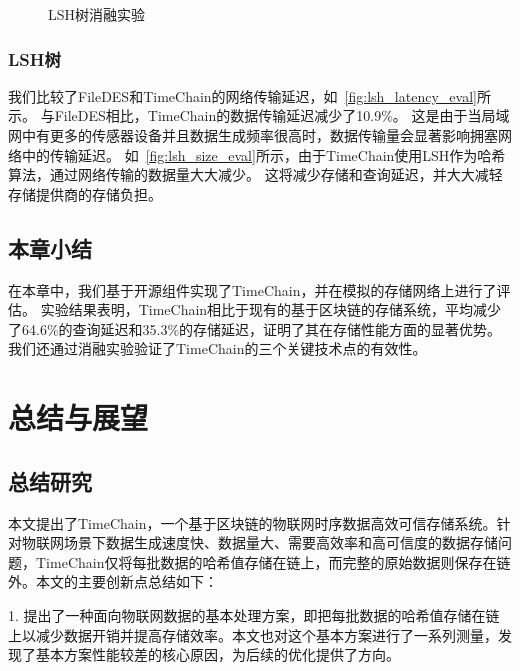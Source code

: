 \begin{figure*}[t]
    \centering
    \begin{minipage}{0.96\linewidth}
        \vspace{-0.5ex}
        \caption{LSH树消融实验} 
    \end{minipage}
\end{figure*}

\subsection{LSH树}
我们比较了FileDES和TimeChain的网络传输延迟，如~\autoref{fig:lsh_latency_eval}所示。
与FileDES相比，TimeChain的数据传输延迟减少了10.9\%。
这是由于当局域网中有更多的传感器设备并且数据生成频率很高时，数据传输量会显著影响拥塞网络中的传输延迟。
如~\autoref{fig:lsh_size_eval}所示，由于TimeChain使用LSH作为哈希算法，通过网络传输的数据量大大减少。
这将减少存储和查询延迟，并大大减轻存储提供商的存储负担。

\section{本章小结}
在本章中，我们基于开源组件实现了TimeChain，并在模拟的存储网络上进行了评估。
实验结果表明，TimeChain相比于现有的基于区块链的存储系统，平均减少了64.6\%的查询延迟和35.3\%的存储延迟，证明了其在存储性能方面的显著优势。
我们还通过消融实验验证了TimeChain的三个关键技术点的有效性。

\chapter{总结与展望}

\section{总结研究}
本文提出了TimeChain，一个基于区块链的物联网时序数据高效可信存储系统。针对物联网场景下数据生成速度快、数据量大、需要高效率和高可信度的数据存储问题，TimeChain仅将每批数据的哈希值存储在链上，而完整的原始数据则保存在链外。本文的主要创新点总结如下：

1. 提出了一种面向物联网数据的基本处理方案，即把每批数据的哈希值存储在链上以减少数据开销并提高存储效率。本文也对这个基本方案进行了一系列测量，发现了基本方案性能较差的核心原因，为后续的优化提供了方向。

